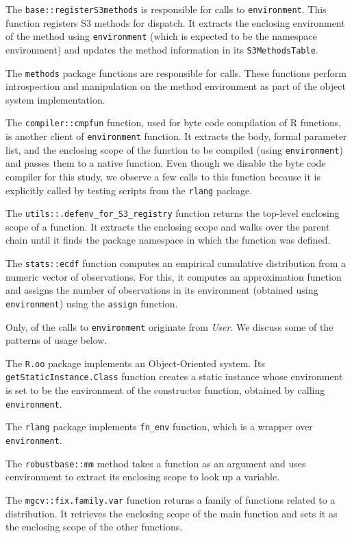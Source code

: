 \documentclass[10pt,review,sigplan,authorversion=true]{acmart}
\renewcommand{\c}[1]{\lstinline |#1|\xspace}
\begin{document}
The \c{base::registerS3methods} is responsible for
\EnvironmentBaseRegisterMethodCallPerc calls to
\c{environment}. This function registers S3 methods for dispatch. It extracts
the enclosing environment of the method using \c{environment} (which is expected
to be the namespace environment) and updates the method information in its
\c{S3MethodsTable}.

The \c{methods} package functions are responsible for
\EnvironmentMethodsCallPerc calls. These functions perform introspection and
manipulation on the method environment as part of the object system
implementation.

The \c{compiler::cmpfun} function, used for byte code compilation of R
functions, is another client of \c{environment} function. It extracts the body,
formal parameter list, and the enclosing scope of the function to be compiled
(using \c{environment}) and passes them to a native function. Even though we
disable the byte code compiler for this study, we observe a few calls to this
function because it is explicitly called by testing scripts from the \c{rlang}
package.

The \c{utils::.defenv_for_S3_registry} function returns the top-level enclosing
scope of a function. It extracts the enclosing scope and walks over the parent
chain until it finds the package namespace in which the function was defined.

The \c{stats::ecdf} function computes an empirical cumulative distribution from
a numeric vector of observations. For this, it computes an approximation
function and assigns the number of observations in its environment (obtained
using \c{environment}) using the \c{assign} function.

Only, \EnvironmentUserCallPerc of the calls to \c{environment} originate from
\emph{User}. We discuss some of the patterns of usage below.

The \c{R.oo} package implements an Object-Oriented system. Its
\c{getStaticInstance.Class} function creates a static instance whose environment
is set to be the environment of the constructor function, obtained by calling
\c{environment}.

The \c{rlang} package implements \c{fn_env} function, which is a wrapper over
\c{environment}.

The \c{robustbase::mm} method takes a function as an argument and uses
c{environment} to extract its enclosing scope to look up a variable.

The \c{mgcv::fix.family.var} function returns a family of functions related to a
distribution. It retrieves the enclosing scope of the main function and sets it
as the enclosing scope of the other functions.
\end{document}
